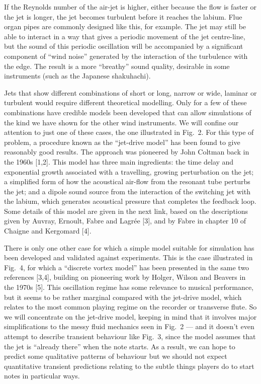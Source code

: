   If the Reynolds number of the air-jet is higher, either because the flow is 
  faster or the jet is longer, the jet becomes turbulent before it reaches the 
  labium. Flue organ pipes are commonly designed like this, for example. The 
  jet may still be able to interact in a way that gives a periodic movement of 
  the jet centre-line, but the sound of this periodic oscillation will be 
  accompanied by a significant component of “wind noise” generated by the 
  interaction of the turbulence with the edge. The result is a more “breathy” 
  sound quality, desirable in some instruments (such as the Japanese 
  shakuhachi). 

  Jets that show different combinations of short or long, narrow or wide, 
  laminar or turbulent would require different theoretical modelling. Only for 
  a few of these combinations have credible models been developed that can 
  allow simulations of the kind we have shown for the other wind instruments. 
  We will confine our attention to just one of these cases, the one illustrated 
  in Fig.\ 2. For this type of problem, a procedure known as the “jet-drive 
  model” has been found to give reasonably good results. The approach was 
  pioneered by John Coltman back in the 1960s [1,2]. This model has three main 
  ingredients: the time delay and exponential growth associated with a 
  travelling, growing perturbation on the jet; a simplified form of how the 
  acoustical air-flow from the resonant tube perturbs the jet; and a dipole 
  sound source from the interaction of the switching jet with the labium, which 
  generates acoustical pressure that completes the feedback loop. Some details 
  of this model are given in the next link, based on the descriptions given by 
  Auvray, Ernoult, Fabre and Lagrée [3], and by Fabre in chapter 10 of Chaigne 
  and Kergomard [4]. 

  There is only one other case for which a simple model suitable for simulation 
  has been developed and validated against experiments. This is the case 
  illustrated in Fig.\ 4, for which a “discrete vortex model” has been 
  presented in the same two references [3,4], building on pioneering work by 
  Holger, Wilson and Beavers in the 1970s [5]. This oscillation regime has some 
  relevance to musical performance, but it seems to be rather marginal compared 
  with the jet-drive model, which relates to the most common playing regime on 
  the recorder or transverse flute. So we will concentrate on the jet-drive 
  model, keeping in mind that it involves major simplifications to the messy 
  fluid mechanics seen in Fig.\ 2 — and it doesn’t even attempt to describe 
  transient behaviour like Fig.\ 3, since the model assumes that the jet is 
  ``already there'' when the note starts. As a result, we can hope to predict 
  some qualitative patterns of behaviour but we should not expect quantitative 
  transient predictions relating to the subtle things players do to start notes 
  in particular ways. 

